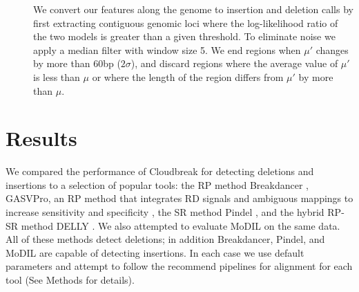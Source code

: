\documentclass[11pt]{article}
\begin{document}
\begin{description}
\item[] We convert our features along the genome to insertion and deletion calls by first extracting contiguous genomic loci where the log-likelihood ratio of the two models is greater than a given threshold. To eliminate noise we apply a median filter with window size 5. We end regions when $\mu'$ changes by more than 60bp ($2\sigma$), and discard regions where the average value of $\mu'$ is less than $\mu$ or where the length of the region differs from $\mu'$ by more than $\mu$.
\end{description}


\section{Results}\label{results}

We compared the performance of Cloudbreak for detecting deletions and insertions to a selection of popular tools: the RP method Breakdancer \autocite{Chen:2009p3}, GASVPro, an RP method that integrates RD signals and ambiguous mappings to increase sensitivity and specificity \autocite{Sindi:2012kk}, the SR method Pindel \autocite{Ye:2009p2}, and the hybrid RP-SR method DELLY \autocite{Rausch:2012he}. We also attempted to evaluate MoDIL on the same data. All of these methods detect deletions; in addition Breakdancer, Pindel, and MoDIL are capable of detecting insertions. In each case we use default parameters and attempt to follow the recommend pipelines for alignment for each tool (See Methods for details).
\end{document}
